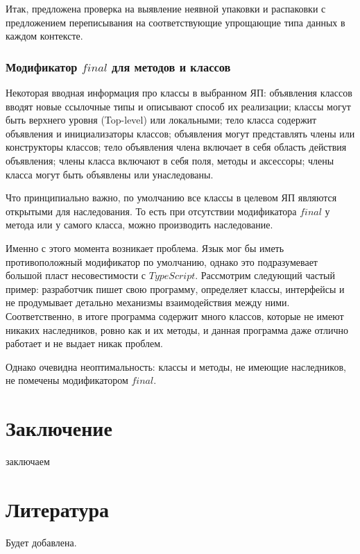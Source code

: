 \documentclass{mipt-thesis-bs}
\begin{document}
Итак, предложена проверка на выявление неявной упаковки и распаковки с предложением
переписывания на соответствующие упрощающие типа данных в каждом контексте.


\subsection{Модификатор $final$ для методов и классов}

Некоторая вводная информация про классы в выбранном ЯП: объявления классов 
вводят новые ссылочные типы и описывают способ их реализации;
классы могут быть верхнего уровня (Top-level) или локальными;
тело класса содержит объявления и инициализаторы классов;
объявления могут представлять члены или конструкторы классов;
тело объявления члена включает в себя область действия объявления;
члены класса включают в себя поля, методы и аксессоры; члены класса могут 
быть объявлены или унаследованы.

Что принципиально важно, по умолчанию все классы в целевом ЯП являются открытыми
для наследования. То есть при отсутствии модификатора $final$ у метода или 
у самого класса, можно производить наследование.

Именно с этого момента возникает проблема. Язык мог бы иметь противоположный
модификатор по умолчанию, однако это подразумевает большой пласт несовестимости
с $TypeScript$. Рассмотрим следующий частый пример: разработчик пишет свою программу, 
определяет классы, интерфейсы и не продумывает детально механизмы взаимодействия между ними.
Соответственно, в итоге программа содержит много классов, которые не имеют никаких 
наследников, ровно как и их методы, и данная программа даже отлично работает и не выдает
никак проблем.

Однако очевидна неоптимальность: классы  и методы, не имеющие наследников,
не помечены модификатором $final$.







\chapter{Заключение}
заключаем

\backmatter


\chapter{Литература}

Будет добавлена.
\end{document}
